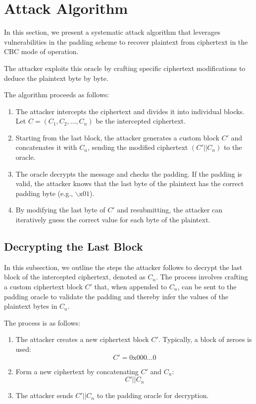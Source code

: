 \documentclass[conference]{IEEEtran}
\begin{document}
\section{Attack Algorithm}

In this section, we present a systematic attack algorithm that leverages vulnerabilities in the padding scheme to recover plaintext from ciphertext in the CBC mode of operation. 

The attacker exploits this oracle by crafting specific ciphertext modifications to deduce the plaintext byte by byte. 

The algorithm proceeds as follows:
\begin{enumerate}
    \item The attacker intercepts the ciphertext and divides it into individual blocks. Let \(C = (C_1, C_2, \dots, C_n)\) be the intercepted ciphertext.
    \item Starting from the last block, the attacker generates a custom block \(C'\) and concatenates it with \(C_n\), sending the modified ciphertext \((C' || C_n)\) to the oracle.
    \item The oracle decrypts the message and checks the padding. If the padding is valid, the attacker knows that the last byte of the plaintext has the correct padding byte (e.g., \(\backslash \text{x}01\)).
    \item By modifying the last byte of \(C'\) and resubmitting, the attacker can iteratively guess the correct value for each byte of the plaintext.
\end{enumerate}

\subsection{Decrypting the Last Block}

In this subsection, we outline the steps the attacker follows to decrypt the last block of the intercepted ciphertext, denoted as \(C_n\). The process involves crafting a custom ciphertext block $C'$ that, when appended to $C_n$, can be sent to the padding oracle to validate the padding and thereby infer the values of the plaintext bytes in $C_n$.

The process is as follows:
\begin{enumerate}
    \item The attacker creates a new ciphertext block \(C'\). Typically, a block of zeroes is used:
    \[
    C' = \text{0x000}\ldots\text{0}
    \]
    \item Form a new ciphertext by concatenating \(C'\) and \(C_n\):
    \[
    C' || C_n
    \]
    \item The attacker sends \(C' || C_n\) to the padding oracle for decryption.
\end{enumerate}
\end{document}
